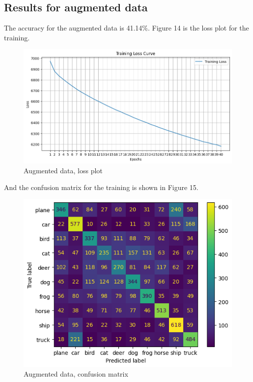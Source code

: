 \documentclass[conference]{IEEEtran}
\begin{document}
\subsection{Results for augmented data}
The accuracy for the augmented data is 41.14\%. Figure 14 is the loss plot for the training.
\begin{figure}[!h]
  \centering
  \includegraphics[scale=0.4]{./images/output/loss2.png}
  \caption{Augmented data, loss plot}
\end{figure}

And the confusion matrix for the training is shown in Figure 15.
\begin{figure}[!h]
  \centering
  \includegraphics[scale=0.5]{./images/output/train2.png}
  \caption{Augmented data, confusion matrix}
\end{figure}
\end{document}
